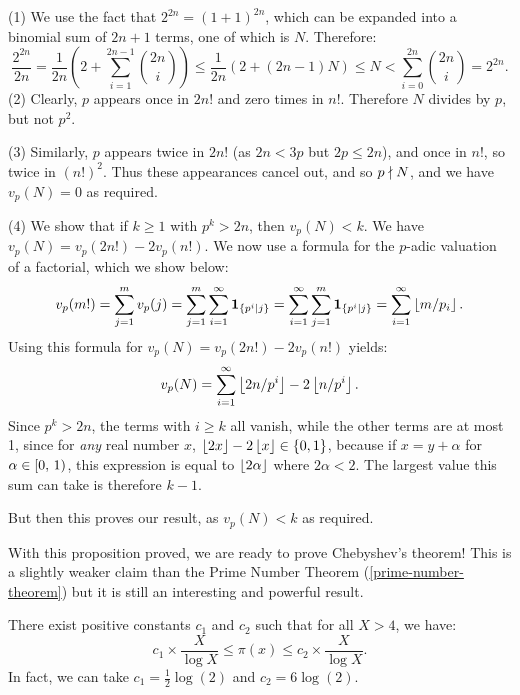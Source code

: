 \documentclass{article}
\begin{document}
\begin{prf}
    (1) We use the fact that $2^{2n} = (1+1)^{2n}$, which can be expanded into a binomial sum of $2n+1$ terms, one of which is $N$. Therefore:
    \[
    \frac{2^{2n}}{2n} = 
	\frac{1}{2n} \left( 2 + \sum_{i=1}^{2n-1} \binom{2n}{i} \right)
	\leq \frac{1}{2n} \left( 2 + (2n-1)N \right)
	\leq N <
	\sum_{i=0}^{2n} \binom{2n}{i} = 2^{2n}.
	\]
	(2) Clearly, $p$ appears once in $2n!$ and zero times in $n!$. Therefore $N$ divides by $p$, but not $p^2$.
	
	(3) Similarly, $p$ appears twice in $2n!$ (as $2n < 3p$ but $2p \leq 2n$), and once in $n!$, so twice in $(n!)^2$. Thus these appearances cancel out, and so $p \nmid N$, and we have $v_p(N) = 0$ as required.
	
	(4) We show that if $k \geq 1$ with $p^k > 2n$, then $v_p(N) < k$. We have $v_p(N) = v_p(2n!) - 2v_p(n!)$. We now use a formula for the $p$-adic valuation of a factorial, which we show below:
	\[
	v_p(m!) = \sum_{j=1}^m v_p(j) =
	\sum_{j=1}^m \sum_{i=1}^\infty
	\textbf{1}_{\left\lbrace p^i \mid j \right\rbrace} =
	\sum_{i=1}^\infty \sum_{j=1}^m
	\textbf{1}_{\left\lbrace p^i \mid j \right\rbrace} =
	\sum_{i=1}^\infty \left\lfloor m/p_i\right\rfloor.
	\]
	Using this formula for $v_p(N) = v_p(2n!) - 2v_p(n!)$ yields:
	\[
	v_p(N) = \sum_{i=1}^\infty \left\lfloor2n/p^i\right\rfloor - 2\left\lfloor n/p^i\right\rfloor.
	\]
	Since $p^k > 2n$, the terms with $i \geq k$ all vanish, while the other terms are at most 1, since for \textit{any} real number $x$, $\left\lfloor2x\right\rfloor - 2 \left\lfloor x\right\rfloor \in \left\lbrace 0, 1 \right\rbrace$, because if $x = y + \alpha$ for $\alpha \in [0, \, 1)$, this expression is equal to $\left\lfloor2\alpha\right\rfloor$ where $2\alpha < 2$. The largest value this sum can take is therefore $k-1$.
	
	But then this proves our result, as $v_p(N) < k$ as required.
\end{prf}

With this proposition proved, we are ready to prove Chebyshev's theorem! This is a slightly weaker claim than the Prime Number Theorem (\ref{prime-number-theorem}) but it is still an interesting and powerful result.

\begin{theorem}
	There exist positive constants $c_1$ and $c_2$ such that for all $X > 4$, we have:
	\[
	c_1 \times \frac{X}{\log X} \leq \pi(x) \leq c_2 \times \frac{X}{\log X}.
	\]
	In fact, we can take $c_1 = \tfrac{1}{2}\log(2)$ and $c_2 = 6 \log(2)$.
\end{theorem}
\end{document}
